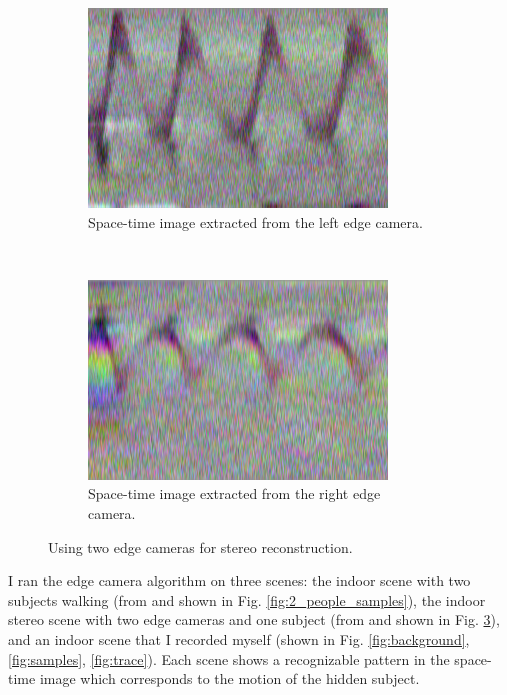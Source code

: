 \documentclass{article}
\begin{document}
\begin{figure}[htbp]
    \begin{subfigure}[t]{0.45\textwidth}
        \includegraphics[width=\textwidth]{img/stereo_trace_1.png}
        \caption{Space-time image extracted from the left edge camera.}
        \label{fig:stereo-trace-left}
    \end{subfigure}
    ~
    \begin{subfigure}[t]{0.45\textwidth}
        \includegraphics[width=\textwidth]{img/stereo_trace_2.png}
        \caption{Space-time image extracted from the right edge camera.}
        \label{fig:stereo-trace-right}
    \end{subfigure}
    \caption{Using two edge cameras for stereo reconstruction.}
    \label{fig:stereo}
\end{figure}

I ran the edge camera algorithm on three scenes: the indoor scene with two subjects walking (from \cite{bouman_turningcornerscameras2017} and shown in Fig. \ref{fig:2_people_samples}), the indoor stereo scene with two edge cameras and one subject (from \cite{bouman_turningcornerscameras2017} and shown in Fig. \ref{fig:stereo}), and an indoor scene that I recorded myself (shown in Fig. \ref{fig:background}, \ref{fig:samples}, \ref{fig:trace}). Each scene shows a recognizable pattern in the space-time image which corresponds to the motion of the hidden subject. 
\end{document}
